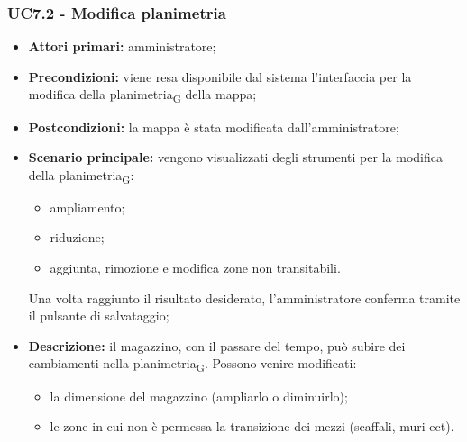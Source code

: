 \subsubsection{UC7.2 - Modifica planimetria}
\begin{itemize}
	\item 	\textbf{Attori primari:} amministratore;
	\item 	\textbf{Precondizioni:} viene resa disponibile dal sistema l'interfaccia per la modifica della \gls{planimetria}\textsubscript{G} della mappa;
	\item 	\textbf{Postcondizioni:} la mappa è stata modificata dall'amministratore;
	\item 	\textbf{Scenario principale:} vengono visualizzati degli strumenti per la modifica della \gls{planimetria}\textsubscript{G}:
	\begin{itemize}
		\item ampliamento;
		\item riduzione;
		\item aggiunta, rimozione e modifica zone non transitabili.
	\end{itemize}
	Una volta raggiunto il risultato desiderato, l'amministratore conferma tramite il pulsante di salvataggio;
	\item 	\textbf{Descrizione:} il magazzino, con il passare del tempo, può subire dei cambiamenti nella \gls{planimetria}\textsubscript{G}. Possono venire modificati:
	\begin{itemize}
		\item la dimensione del magazzino (ampliarlo o diminuirlo);
		\item le zone in cui non è permessa la transizione dei mezzi (scaffali, muri ect).
	\end{itemize}
\end{itemize}

